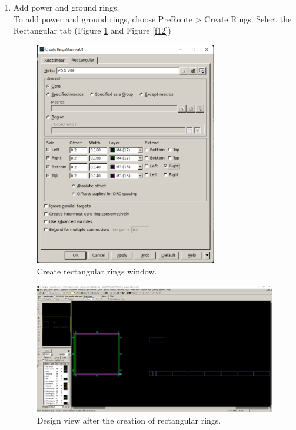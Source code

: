 \documentclass[a4paper,12pt,twoside]{article}
\begin{document}
\begin{enumerate}
\begin{enumerate}
\begin{verbatim}
        \end{verbatim}
        \item Add power and ground rings.\\
        To add power and ground rings, choose PreRoute > Create Rings. Select the Rectangular tab (Figure \ref{f11} and Figure \ref{f12})
        \begin{figure}[H]
            \centering
            \includegraphics[width=0.75\textwidth]{images/11.png}
            \caption{Create rectangular rings window.}
            \label{f11}
        \end{figure}
        \begin{figure}[H]
            \centering
            \includegraphics[width=\textwidth]{images/12.png}
            \caption{Design view after the creation of rectangular rings.}

\end{figure}
\end{enumerate}
\end{enumerate}
\end{document}
